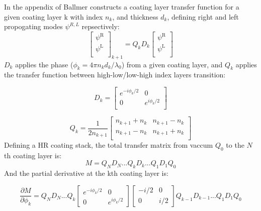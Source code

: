 In the appendix of \cite{ballmer:2015} Ballmer constructs a coating layer transfer function for a given coating layer k with index $n_k$, and thickness $d_k$, defining right and left propogating modes $\psi^{R,L}$ repsectively:
$$
  \left[ {\begin{array}{c}
   \psi^\mathrm{R} \\
   \psi^\mathrm{L} \\
  \end{array} } \right]_{k+1}
  =
%
Q_k D_k
%
 \left[{\begin{array}{c}
   \psi^\mathrm{R} \\
   \psi^\mathrm{L} \\
 \end{array}} \right]
$$
\noindent $D_k$ applies the phase ($\phi_k = 4\pi n_k d_k /\lambda_0$) from a given coating layer, and $Q_k$ applies the transfer function between high-low/low-high index layers transition:

\begin{equation}
D_k =
\left[ {\begin{array}{cc}
  e^{-i \phi_k / 2}& 0\\
 0 & e^{i \phi_k / 2}\\
\end{array} } \right]
\end{equation}

\begin{equation}
Q_k = \frac{1}{2n_{k+1}}
\left[ {\begin{array}{cc}
  n_{k+1} + n_k & n_{k+1} - n_k\\
 n_{k+1} - n_k & n_{k+1} + n_k\\
\end{array} } \right]
\end{equation}
\noindent Defining a HR coating stack, the total transfer matrix from vaccum $Q_0$ to the $N$th coating layer is:
\begin{equation}
	M = Q_N D_N ...Q_k D_k...Q_1D_1Q_0
\end{equation}
\noindent And the partial derivative at the kth coating layer is:

\begin{equation}
	\label{eq:partialM}
	\frac{\partial M}{\partial \phi_k} = Q_N D_N ...Q_{k} \begin{bmatrix} e^{-i \phi_k /2} & 0 \\ 0 & e^{i \phi_k/2} \end{bmatrix} \begin{bmatrix} -i /2 & 0 \\ 0 & i/2 \end{bmatrix} Q_{k-1} D_{k-1}...Q_1D_1Q_0
\end{equation}

